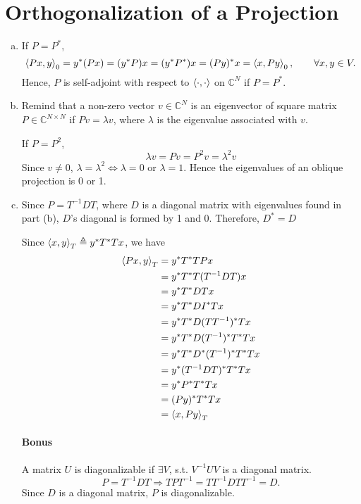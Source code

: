 \section{Orthogonalization of a Projection}\label{sec:part3}

\begin{enumerate}[(a)]
\item If $P = P^*$,
\[\left\langle Px, y \right\rangle_0 = y^* (Px) = (y^*P)x = (y^*P^*)x = (Py)^*x = \left\langle x, Py \right\rangle_0, \qquad \forall x, y \in V.\]
Hence, $P$ is self-adjoint with respect to $\left\langle \cdot, \cdot \right\rangle$ on $\mathbb{C}^N$ if $P = P^*$.

\item Remind that a non-zero vector $v \in \mathbb{C}^N$ is an eigenvector of square matrix $P \in \mathbb{C}^{N\times N}$ if $Pv = \lambda v$, where $\lambda$ is the eigenvalue associated with $v$. 

If $P = P^2$,
\[\lambda v = P v = P^2 v = \lambda^2 v\]
Since $v \neq 0$, $\lambda = \lambda^2 \Leftrightarrow \lambda = 0 \text{ or } \lambda = 1$. Hence the eigenvalues of an oblique projection is 0 or 1.

\item Since $P = T^{-1}DT$, where $D$ is a diagonal matrix with eigenvalues found in part (b), $D$'s diagonal is formed by 1 and 0. Therefore, $D^* = D$

Since $\left\langle x, y \right\rangle_T \triangleq y^*T^*Tx$, we have
\begin{align*}
	\left\langle Px, y \right\rangle_T
	&= y^* T^* T P x \\
	&= y^* T^* T (T^{-1} D T) x \\
	&= y^* T^* D T x \\
	&= y^* T^* D I^* T x \\
	&= y^* T^* D (T T^{-1})^* T x \\
	&= y^* T^* D (T^{-1})^* T^* T x \\
	&= y^* T^* D^* (T^{-1})^* T^* T x \\
	&= y^* (T^{-1}DT)^* T^* T x \\
	&= y^* P^* T^* T x \\
	&= (Py)^* T^* T x \\
	&= \left\langle x, Py \right\rangle_T
\end{align*}

\paragraph{Bonus} A matrix $U$ is diagonalizable if $\exists V$, s.t. $V^{-1} U V$ is a diagonal matrix.
\[P = T^{-1} D T \Rightarrow T P T^{-1} = T T^{-1}D T T^{-1} = D.\]
Since $D$ is a diagonal matrix, $P$ is diagonalizable.


\end{enumerate}
